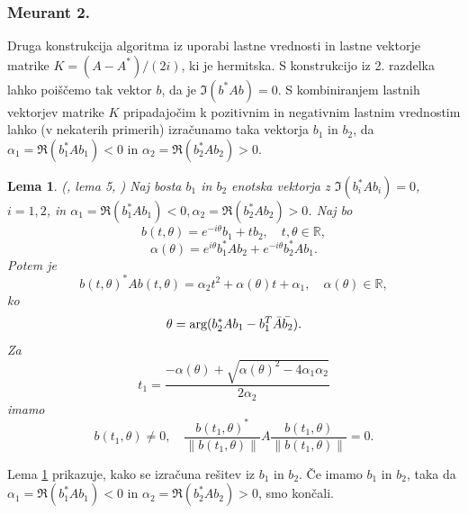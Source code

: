 \documentclass[12pt,a4paper]{amsart}
\theoremstyle{definition}
\theoremstyle{plain}
\newtheorem{lema}[definicija]{Lema}
\newcommand{\R}{\mathbb R}
\newcommand{\norm}[1]{\left\lVert#1\right\rVert}
\begin{document}
\subsubsection{Meurant 2.}\label{Meurant 2}
Druga konstrukcija algoritma iz \cite{meurant} uporabi lastne vrednosti in lastne vektorje matrike $K=(A-A^\ast)/(2i)$, ki je hermitska.
S konstrukcijo iz 2. razdelka lahko poiščemo tak vektor $b$, da je $\Im(b^\ast Ab)=0$. 
S kombiniranjem lastnih vektorjev matrike $K$ pripadajočim k pozitivnim in negativnim lastnim vrednostim lahko (v nekaterih primerih) izračunamo taka vektorja $b_1$ in $b_2$, da $\alpha_1=\Re(b_1^\ast Ab_1)<0$ in $\alpha_2=\Re(b_2^\ast Ab_2)>0$. 
\begin{lema}\label{komp}(\cite{meurant}, lema 5, \cite{num})
Naj bosta $b_1$ in $b_2$ enotska vektorja z $\Im(b_i^\ast Ab_i)=0$, $i=1,2$, in $\alpha_1=\Re(b_1^\ast Ab_1)<0, \alpha_2=\Re(b_2^\ast Ab_2)>0$. Naj bo 
$$b(t,\theta)=e^{-i\theta}b_1 + tb_2, \quad t,\theta \in \R,$$ 
$$\alpha(\theta)=e^{i\theta}b_1^\ast Ab_2 +e^{-i\theta}b_2^\ast Ab_1.$$
Potem je 
$$b(t,\theta)^\ast Ab(t,\theta)=\alpha_2 t^2 +\alpha(\theta)t+\alpha_1,\quad \alpha(\theta)\in\R,$$ ko 
$$\theta= \textnormal{arg}(b_2^\ast Ab_1 -b_1^T\bar{A}\bar{b_2}).$$ Za 
$$t_1 = \frac{-\alpha(\theta) + \sqrt{\alpha(\theta)^2 - 4\alpha_1 \alpha_2}}{2\alpha_2}$$ imamo 
$$b(t_1, \theta) \not=0,\quad  \frac{b(t_1,\theta)^\ast}{\norm{b(t_1,\theta)}}A\frac{b(t_1,\theta)}{\norm{b(t_1,\theta)}}=0.$$

\end{lema}
Lema \ref{komp} prikazuje, kako se izračuna rešitev iz $b_1$ in $b_2$. Če imamo $b_1$ in $b_2$, taka da  $\alpha_1=\Re(b_1^\ast Ab_1)<0$ in $\alpha_2=\Re(b_2^\ast Ab_2)>0$, smo končali.
\end{document}
